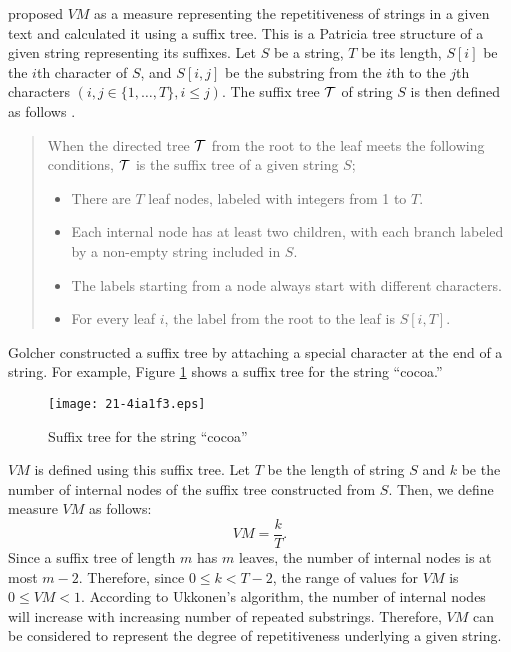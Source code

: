 \documentclass[english]{jnlp_1.4_rep}
\begin{document}
\cite{Golcher} proposed $\mathit{VM}$ as a measure representing the repetitiveness of strings in a given text and calculated it using a suffix tree. 
This is a Patricia tree structure of a given string representing its suffixes. 
Let $S$ be a string, $T$ be its length, $S[i]$ be the $i$th character of $S$, and $S[i,j]$ be the substring from the $i$th to the $j$th 
characters $(i,j\in\{1,\ldots,T\}, i \leq j)$. 
The suffix tree ${\cal T}$ of string $S$ is then defined as follows \cite{Ukkonen}. 
\begin{quote}
When the directed tree ${\cal T}$ from the root to the leaf meets the following conditions, ${\cal T}$ is the suffix tree of a given string $S$;
\begin{itemize}
\item There are $T$ leaf nodes, labeled with integers from 1 to $T$. 
\item Each internal node has at least two children, with each branch labeled by a non-empty string included in $S$. 
\item The labels starting from a node always start with different characters. 
\item For every leaf $i$, the label from the root to the leaf is $S[i,T]$. 
\end{itemize}
\end{quote}
Golcher constructed a suffix tree by attaching a special character at the end of a string. For example, Figure \ref{fig:cocoa} shows a suffix tree for the string ``cocoa.''

\begin{figure}[b]
\begin{center}
\texttt{[image: 21-4ia1f3.eps]}
\end{center}
\caption{Suffix tree for the string ``cocoa''}
\label{fig:cocoa}
\end{figure}

$\mathit{VM}$ is defined using this suffix tree. Let $T$ be the length of string $S$ and $k$ be the number of internal nodes of the suffix tree constructed from $S$. Then, we define measure $\mathit{VM}$ as follows:
\begin{equation}
 \mathit{VM} = \frac{k}{T}.   \label{eq:v}
\end{equation}
Since a suffix tree of length $m$ has $m$ leaves, the number of internal nodes is at most $m-2$. 
Therefore, since $0\leq k < T-2$, the range of values for $\mathit{VM}$ is $0\leq \mathit{VM} < 1$. According to Ukkonen's algorithm, 
the number of internal nodes will increase with increasing number of repeated substrings. 
Therefore, $\mathit{VM}$ can be considered to represent the degree of repetitiveness underlying a given string. 
\end{document}
